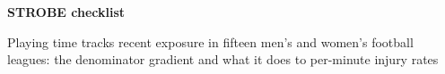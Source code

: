 \documentclass[10pt]{article}
\begin{document}
\begin{center}
{\Large\bfseries STROBE checklist\par}
\vspace{0.4em}
{\large Playing time tracks recent exposure in fifteen men's and women's
football leagues: the denominator gradient and what it does to per-minute
injury rates\par}
\end{center}

\vspace{0.5em}


\end{document}
